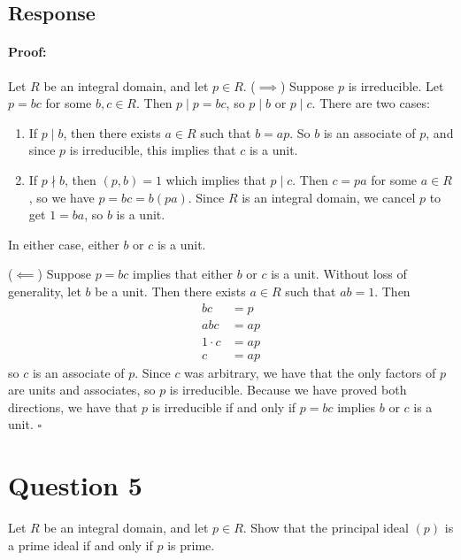 \documentclass [12pt] {article}
\newenvironment{proof}{\paragraph{Proof:}}{\hfill$\square$}
\begin{document}
\subsection*{Response}
\begin{proof}
    Let $R$ be an integral domain, and let $p \in R$.
    \newline
    ($\implies$)
    Suppose $p$ is irreducible. Let $p = bc$ for some $b, c \in R$. Then $p \mid p = bc$, so
    $p \mid b$ or $p \mid c$. There are two cases:
    \begin{enumerate}[label=\textbf{Case \arabic*:}, leftmargin=*]
        \item  If $p \mid b$, then there exists $a \in R$ such that $b = ap$. So $b$ is an associate
            of $p$, and since $p$ is irreducible, this implies that $c$ is a unit.
        \item If $p \nmid b$, then $(p, b) = 1$ which implies that $p \mid c$. Then $c = pa$ for
            some $a \in R$, so we have $p = bc = b(pa)$. Since $R$ is an integral domain, we cancel
            $p$ to get $1 = ba$, so $b$ is a unit.
    \end{enumerate}
    In either case, either $b$ or $c$ is a unit.
    \vspace{1em}

    ($\impliedby$)
    Suppose $p = bc$ implies that either $b$ or $c$ is a unit. Without loss of generality, let $b$
    be a unit. Then there exists $a \in R$ such that $ab = 1$. Then
    \begin{align*}
        bc &= p \\
        abc &= ap \\
        1 \cdot c &= ap \\
        c &= ap
    \end{align*}
    so $c$ is an associate of $p$. Since $c$ was arbitrary, we have that the only factors of $p$ are
    units and associates, so $p$ is irreducible. Because we have proved both directions, we have
    that $p$ is irreducible if and only if $p = bc$ implies $b$ or $c$ is a unit.
\end{proof}
\newpage


\section*{Question 5}
Let $R$ be an integral domain, and let $p\in R$. Show that the principal ideal $(p)$ is a prime
ideal if and only if $p$ is prime.
\end{document}
